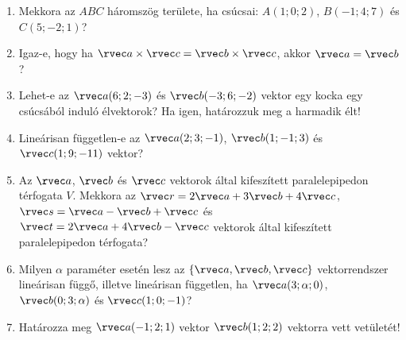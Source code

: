 \documentclass[a4paper, 12pt]{scrartcl}
\begin{document}
\begin{enumerate}
  \item Mekkora az $ABC$ háromszög területe, ha csúcsai: $A(1; 0; 2)$,
        $B(-1; 4; 7)$ és $C(5; -2; 1)$?

  \item Igaz-e, hogy ha $\rvec a \times \rvec c = \rvec b \times \rvec c$, akkor
        $\rvec a = \rvec b$?

  \item Lehet-e az $\rvec a(6; 2; -3)$ és $\rvec b(-3; 6; -2)$ vektor egy kocka
        egy csúcsából induló élvektorok? Ha igen, határozzuk meg a harmadik élt!

  \item Lineárisan független-e az $\rvec a(2; 3; -1)$, $\rvec b(1; -1; 3)$
        és $\rvec c(1; 9; -11)$ vektor?

  \item Az $\rvec a$, $\rvec b$ és $\rvec c$ vektorok által kifeszített
        paralelepipedon térfogata $V$. Mekkora az $\rvec r = 2 \rvec a + 3
          \rvec b + 4 \rvec c$, $\rvec s = \rvec a - \rvec b + \rvec c$ és
        $\rvec t = 2 \rvec a + 4 \rvec b - \rvec c$ vektorok által kifeszített
        paralelepipedon térfogata?

  \item Milyen $\alpha$ paraméter esetén lesz az $\{ \rvec a, \rvec b, \rvec c \}$
        vektorrendszer lineárisan függő, illetve lineárisan független, ha
        $\rvec a (3; \alpha; 0)$, $\rvec b (0; 3; \alpha)$ és $\rvec c
          (1; 0; -1)$?

  \item Határozza meg $\rvec a(-1; 2; 1)$ vektor $\rvec b(1; 2; 2)$ vektorra
        vett vetületét!
\end{enumerate}

\end{document}
